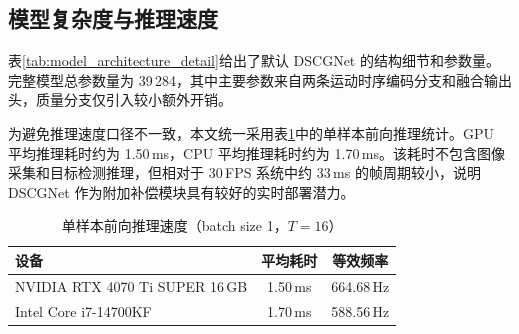 \documentclass[journal]{IEEEtran}
\begin{document}
\subsection{模型复杂度与推理速度}
表\ref{tab:model_architecture_detail}给出了默认 DSCGNet 的结构细节和参数量。完整模型总参数量为 39\,284，其中主要参数来自两条运动时序编码分支和融合输出头，质量分支仅引入较小额外开销。

\begin{table}[!t]
\centering
\caption{所提 DSCGNet 的详细架构（质量分支开启）}
\label{tab:model_architecture_detail}
\small
\setlength{\tabcolsep}{2.5pt}
\end{table}

为避免推理速度口径不一致，本文统一采用表\ref{tab:latency}中的单样本前向推理统计。GPU 平均推理耗时约为 1.50\,ms，CPU 平均推理耗时约为 1.70\,ms。该耗时不包含图像采集和目标检测推理，但相对于 30\,FPS 系统中约 33\,ms 的帧周期较小，说明 DSCGNet 作为附加补偿模块具有较好的实时部署潜力。

\begin{table}[!t]
\centering
\caption{单样本前向推理速度（batch size 1，$T=16$）}
\label{tab:latency}
\begin{tabular}{lcc}
\toprule
\textbf{设备} & \textbf{平均耗时} & \textbf{等效频率} \\
\midrule
NVIDIA RTX 4070 Ti SUPER 16\,GB & 1.50\,ms & 664.68\,Hz \\
Intel Core i7-14700KF & 1.70\,ms & 588.56\,Hz \\
\bottomrule
\end{tabular}
\end{table}
\end{document}
